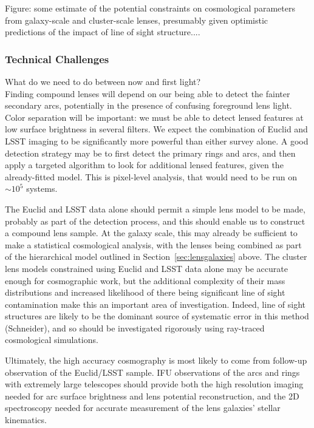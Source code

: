 \documentclass[twocolumn]{svjour3}
\begin{document}
Figure: some estimate of the potential constraints on cosmological
parameters from galaxy-scale and cluster-scale lenses, presumably given
optimistic predictions of the impact of line of sight structure....


\subsubsection{Technical Challenges}

What do we need to do between now and first light?\\

Finding compound lenses will depend on our being able to detect the
fainter secondary arcs, potentially in the presence of confusing
foreground lens light. Color separation will be important: we must be
able to detect lensed features at low surface brightness in several
filters. We expect the combination of Euclid and LSST imaging to be
significantly more powerful than either survey alone. A good detection
strategy may be to first detect the primary rings and arcs, and then
apply a targeted algorithm to look for additional lensed features, given
the already-fitted model. This is pixel-level analysis, that would need
to be run on $\sim 10^5$ systems.

The Euclid and LSST data alone should permit a simple lens model to be
made, probably as part of the detection process, and this should enable
us to construct a compound lens sample. At the galaxy scale, this may
already be sufficient to make a statistical cosmological analysis, with
the lenses being combined as part of the hierarchical model outlined in
Section~\ref{sec:lensgalaxies} above. The cluster lens models
constrained using Euclid and LSST data alone may be accurate enough for
cosmographic work, but the additional complexity of their mass
distributions and increased likelihood of there being significant line
of sight contamination make this an important area of investigation.
Indeed, line of sight structures are likely to be the dominant source of
systematic error in this method (Schneider), and so should be
investigated rigorously using ray-traced cosmological simulations.

Ultimately, the high accuracy cosmography is most likely to come from
follow-up observation of the Euclid/LSST sample. IFU observations of the
arcs and rings with extremely large telescopes should provide both the
high resolution imaging needed for arc surface brightness and lens
potential reconstruction, and the 2D spectroscopy needed for accurate
measurement of the lens galaxies' stellar kinematics.\\
\end{document}
